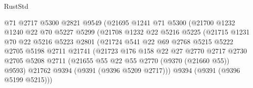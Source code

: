 \begin{lexlean}{RustStd}
\begin{coremodule}
                                @71
                                @2717
                                @5300
                                @2821
                                @9549
                                (@21695
                                  @1241
                                  @71
                                  @5300
                                  (@21700
                                    @1232
                                    @1240
                                    @22
                                    @70
                                    @5227
                                    @5299
                                    (@21708
                                      @1232
                                      @22
                                      @5216
                                      @5225
                                      (@21715
                                        @1231
                                        @70
                                        @22
                                        @5216
                                        @5223
                                        @2801
                                        (@21724
                                          @541
                                          @22
                                          @69
                                          @2768
                                          @5215
                                          @5222
                                          @2705
                                          @5198
                                          @2711
                                          @21741
                                          (@21723
                                            @176
                                            @158
                                            @22
                                            @27
                                            @2770
                                            @2717
                                            @2730
                                            @2705
                                            @5208
                                            @2711
                                            (@21655 @55 @22 @55 @2770 (@9370 (@21660 @55)) @9593)
                                            @21762
                                            @9394
                                            (@9391 (@9396 @5209 @2717)))
                                          @9394
                                          (@9391 (@9396 @5199 @5215)))

\end{coremodule}
\end{lexlean}
